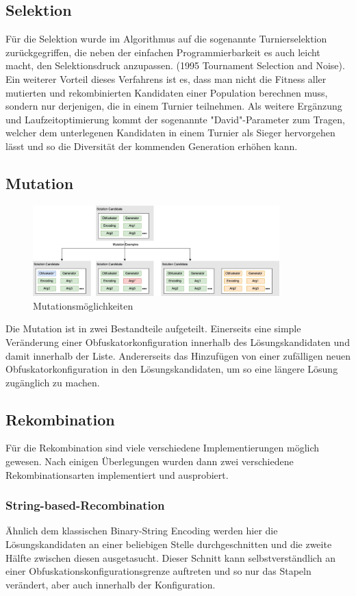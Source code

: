 \subsection{Selektion}
Für die Selektion wurde im Algorithmus auf die sogenannte Turnierselektion zurückgegriffen, die neben der einfachen Programmierbarkeit es auch leicht macht, den Selektionsdruck anzupassen. \cite{blickle_1996_a} (1995 Tournament Selection and Noise). Ein weiterer Vorteil dieses Verfahrens ist es, dass man nicht die Fitness aller mutierten und rekombinierten Kandidaten einer Population berechnen muss, sondern nur derjenigen, die in einem Turnier teilnehmen. Als weitere Ergänzung und Laufzeitoptimierung kommt der sogenannte "David"-Parameter zum Tragen, welcher dem unterlegenen Kandidaten in einem Turnier als Sieger hervorgehen lässt und so die Diversität der kommenden Generation erhöhen kann.

\subsection{Mutation}
\begin{figure}[h]
    \centering
    \includegraphics[width=0.85\textwidth]{gfx/Abbildungen/Mutations.png}
    \caption{Mutationsmöglichkeiten}
    \label{fig:mutations}
\end{figure}
Die Mutation ist in zwei Bestandteile aufgeteilt. Einerseits eine simple Veränderung einer Obfuskatorkonfiguration innerhalb des Lösungskandidaten und damit innerhalb der Liste. Andererseits das Hinzufügen von einer zufälligen neuen Obfuskatorkonfiguration in den Lösungskandidaten, um so eine längere Lösung zugänglich zu machen.


\subsection{Rekombination}
Für die Rekombination sind viele verschiedene Implementierungen möglich gewesen. Nach einigen Überlegungen wurden dann zwei verschiedene Rekombinationsarten implementiert und ausprobiert.
\subsubsection{String-based-Recombination}
Ähnlich dem klassischen Binary-String Encoding werden hier die Lösungskandidaten an einer beliebigen Stelle durchgeschnitten und die zweite Hälfte zwischen diesen ausgetasucht. Dieser Schnitt kann selbstverständlich an einer Obfuskationskonfigurationsgrenze auftreten und so nur das Stapeln verändert, aber auch innerhalb der Konfiguration.
